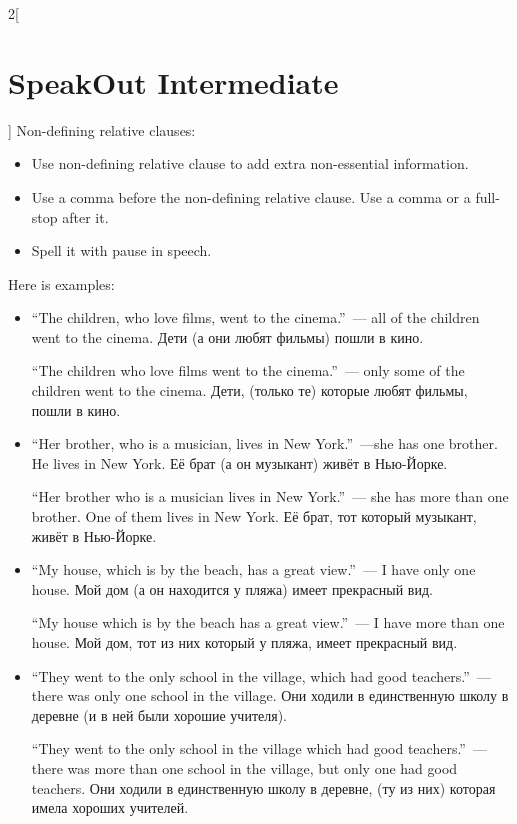 \documentclass[10pt,a4paper]{article}
\newlength{\OriginalParIndent}
\newenvironment{ItemizeWithOrigParIndent}
    {\begin{itemize}[leftmargin=\OriginalParIndent]}
    {\end{itemize}}
\begin{document}
\begin{multicols}{2}[\section{SpeakOut Intermediate}]
Non-defining relative clauses:
\begin{ItemizeWithOrigParIndent}
   \item Use non-defining relative clause to add extra non-essential information.
   \item Use a comma before the non-defining relative clause. Use a comma or a full-stop after it.
   \item Spell it with pause in speech.
\end{ItemizeWithOrigParIndent}

Here is examples:
\begin{ItemizeWithOrigParIndent}
   \item ``The children, who love films, went to the cinema.''~--- all of the children went
   to the cinema. Дети (а они любят фильмы) пошли в кино.

   ``The children who love films went to the cinema.''~--- only some of the children went
   to the cinema. Дети, (только те) которые любят фильмы, пошли в кино.

   \item ``Her brother, who is a musician, lives in New York.''~---she has one brother.
   He lives in New York. Её брат (а он музыкант) живёт в Нью-Йорке.

   ``Her brother who is a musician lives in New York.''~--- she has more than one brother.
   One of them lives in New York. Её брат, тот который музыкант, живёт в Нью-Йорке.

   \item ``My house, which is by the beach, has a great view.''~--- I have only one house.
   Мой дом (а он находится у пляжа) имеет прекрасный вид.

   ``My house which is by the beach has a great view.''~--- I have more than one house.
   Мой дом, тот из них который у пляжа, имеет прекрасный вид.

   \item ``They went to the only school in the village, which had good teachers.''~--- there
   was only one school in the village. Они ходили в единственную школу в деревне
   (и в ней были хорошие учителя).

   ``They went to the only school in the village which had good teachers.''~--- there was
   more than one school in the village, but only one had good teachers. Они ходили в единственную
   школу в деревне, (ту из них) которая имела хороших учителей.
\end{ItemizeWithOrigParIndent}




\end{multicols}
\end{document}
